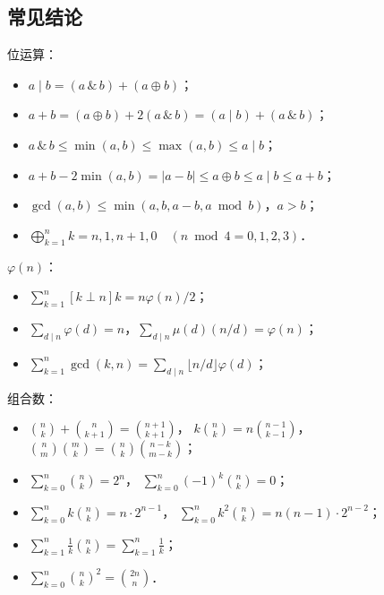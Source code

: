 \subsection{常见结论}

位运算：

\begin{itemize}[noitemsep]
    \item $a \mid b = (a \,\&\, b) + (a \oplus b)$；
    \item $a + b = (a \oplus b) + 2(a \,\&\, b) = (a \mid b) + (a \,\&\, b)$；
    \item $a \,\&\, b \le \min(a, b) \le \max(a, b) \le a \mid b$；
    \item $a + b - 2\min(a, b) = |a - b| \le a \oplus b \le a \mid b \le a + b$；
    \item $\gcd(a, b) \le \min(a, b, a - b, a \bmod b)$，$a > b$；
    \item $\bigoplus_{k=1}^{n} k = n, 1, n + 1, 0 \quad (n \bmod 4 = 0, 1, 2, 3)$．
\end{itemize}

$\varphi(n)$：

\begin{itemize}[noitemsep]
    \item $\sum_{k=1}^{n} [k \perp n] k = n \varphi(n) / 2$；
    \item $\sum_{d \mid n} \varphi(d) = n$，$\sum_{d \mid n} \mu(d) (n / d) = \varphi(n)$；
    \item $\sum_{k=1}^{n}\gcd(k, n) = \sum_{d \mid n} \lfloor n / d \rfloor \varphi(d)$；
\end{itemize}

组合数：

\begin{itemize}[noitemsep]
    \item
        $\binom{n}{k} + \binom{n}{k+1} = \binom{n+1}{k+1}$，
        $k \binom{n}{k} = n \binom{n-1}{k-1}$，
        $\binom{n}{m}\binom{m}{k} = \binom{n}{k}\binom{n-k}{m-k}$；
    \item
        $\sum_{k=0}^{n} \binom{n}{k} = 2^n$，
        $\sum_{k=0}^{n} (-1)^{k}\binom{n}{k} = 0$；
    \item
        $\sum_{k=0}^{n} k \binom{n}{k} = n \cdot 2^{n-1}$，
        $\sum_{k=0}^{n} k^2 \binom{n}{k} = n (n - 1) \cdot 2^{n-2}$；
    \item $\sum_{k=1}^{n} \frac{1}{k} \binom{n}{k} = \sum_{k=1}^{n} \frac{1}{k}$；
    \item $\sum_{k=0}^{n} \binom{n}{k}^2 = \binom{2n}{n}$．
\end{itemize}

